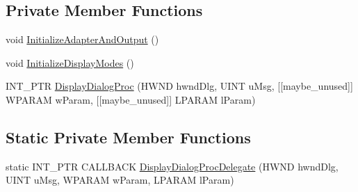 \subsection*{Private Member Functions}
\begin{DoxyCompactItemize}
\item 
void \hyperlink{classmage_1_1_display_configurator_a03fd2c38f6fdb6fbc8ff429a7d0d2a89}{Initialize\+Adapter\+And\+Output} ()
\item 
void \hyperlink{classmage_1_1_display_configurator_a90ecffb8d93768464bb1698531a34db7}{Initialize\+Display\+Modes} ()
\item 
I\+N\+T\+\_\+\+P\+TR \hyperlink{classmage_1_1_display_configurator_a1d84e574699095a994411bbeb058154c}{Display\+Dialog\+Proc} (H\+W\+ND hwnd\+Dlg, U\+I\+NT u\+Msg, \mbox{[}\mbox{[}maybe\+\_\+unused\mbox{]}\mbox{]} W\+P\+A\+R\+AM w\+Param, \mbox{[}\mbox{[}maybe\+\_\+unused\mbox{]}\mbox{]} L\+P\+A\+R\+AM l\+Param)
\end{DoxyCompactItemize}
\subsection*{Static Private Member Functions}
\begin{DoxyCompactItemize}
\item 
static I\+N\+T\+\_\+\+P\+TR C\+A\+L\+L\+B\+A\+CK \hyperlink{classmage_1_1_display_configurator_a3a15e6afa93904c2aaab6c4f5c501fb4}{Display\+Dialog\+Proc\+Delegate} (H\+W\+ND hwnd\+Dlg, U\+I\+NT u\+Msg, W\+P\+A\+R\+AM w\+Param, L\+P\+A\+R\+AM l\+Param)
\end{DoxyCompactItemize}
